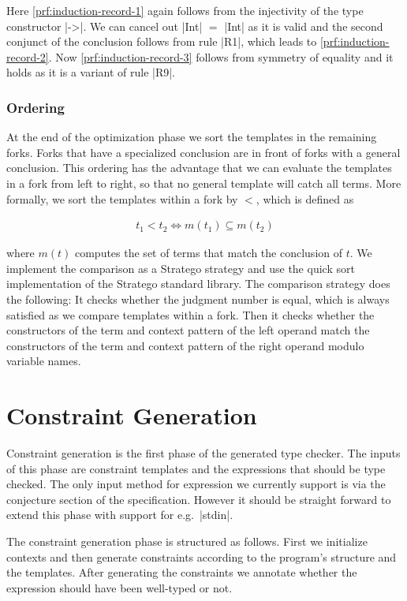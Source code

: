 Here \ref{prf:induction-record-1} again follows from the injectivity
of the type constructor \code|->|. We can cancel out \code|Int| $=$
\code|Int| as it is valid and the second conjunct of the conclusion
follows from rule \code|R1|, which leads to
\ref{prf:induction-record-2}. Now \ref{prf:induction-record-3} follows
from symmetry of equality and it holds as it is a variant of rule
\code|R9|.


\subsubsection{Ordering}
At the end of the optimization phase we sort the templates in the
remaining forks. Forks that have a specialized conclusion are in front
of forks with a general conclusion. This ordering has the advantage
that we can evaluate the templates in a fork from left to right, so
that no general template will catch all terms. More formally, we sort
the templates within a fork by $<$, which is defined as

\begin{align}
  t_1 < t_2 \iff m(t_1) \subseteq m(t_2)
\end{align}

where $m(t)$ computes the set of terms that match the conclusion of
$t$. We implement the comparison as a Stratego strategy and use the
quick sort implementation of the Stratego standard library. The
comparison strategy does the following: It checks whether the judgment
number is equal, which is always satisfied as we compare templates
within a fork. Then it checks whether the constructors of the term and
context pattern of the left operand match the constructors of the term
and context pattern of the right operand modulo variable names.

\section{Constraint Generation}
\label{sec:constr-gener}
Constraint generation is the first phase of the generated type
checker. The inputs of this phase are constraint templates and the
expressions that should be type checked. The only input method for
expression we currently support is via the conjecture section of the
specification. However it should be straight forward to extend this
phase with support for e.g.\ \code|stdin|.

The constraint generation phase is structured as follows. First we
initialize contexts and then generate constraints according to the
program's structure and the templates. After generating the constraints
we annotate whether the expression should have been well-typed or not.

